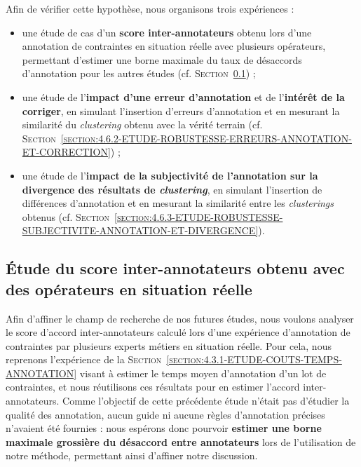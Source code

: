 	
	Afin de vérifier cette hypothèse, nous organisons trois expériences :
	\begin{itemize}
		\item une étude de cas d'un \textbf{score inter-annotateurs} obtenu lors d'une annotation de contraintes en situation réelle avec plusieurs opérateurs, permettant d'estimer une borne maximale du taux de désaccords d'annotation pour les autres études (cf. \textsc{Section~\ref{section:4.6.1-ETUDE-ROBUSTESSE-SCORE-ACCORD}}) ;
		\item une étude de l'\textbf{impact d'une erreur d'annotation} et de l'\textbf{intérêt de la corriger}, en simulant l'insertion d'erreurs d'annotation et en mesurant la similarité du \textit{clustering} obtenu avec la vérité terrain (cf. \textsc{Section~\ref{section:4.6.2-ETUDE-ROBUSTESSE-ERREURS-ANNOTATION-ET-CORRECTION}}) ;
		\item une étude de l'\textbf{impact de la subjectivité de l'annotation sur la divergence des résultats de \textit{clustering}}, en simulant l'insertion de différences d'annotation et en mesurant la similarité entre les \textit{clusterings} obtenus (cf. \textsc{Section~\ref{section:4.6.3-ETUDE-ROBUSTESSE-SUBJECTIVITE-ANNOTATION-ET-DIVERGENCE}}).
	\end{itemize}
		
		
	\subsection{Étude du score inter-annotateurs obtenu avec des opérateurs en situation réelle}
	\label{section:4.6.1-ETUDE-ROBUSTESSE-SCORE-ACCORD}
		
		Afin d'affiner le champ de recherche de nos futures études, nous voulons analyser le score d'accord inter-annotateurs calculé lors d'une expérience d'annotation de contraintes par plusieurs experts métiers en situation réelle.
		Pour cela, nous reprenons l'expérience de la \textsc{Section~\ref{section:4.3.1-ETUDE-COUTS-TEMPS-ANNOTATION}} visant à estimer le temps moyen d'annotation d'un lot de contraintes, et nous réutilisons ces résultats pour en estimer l'accord inter-annotateurs.
		Comme l'objectif de cette précédente étude n'était pas d'étudier la qualité des annotation, aucun guide ni aucune règles d'annotation précises n'avaient été fournies : nous espérons donc pourvoir \textbf{estimer une borne maximale grossière du désaccord entre annotateurs} lors de l'utilisation de notre méthode, permettant ainsi d'affiner notre discussion.
		
